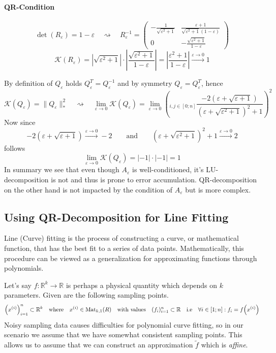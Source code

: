 \paragraph{QR-Condition}
\[\det(R_\varepsilon) = 1 - \varepsilon \quad\rightsquigarrow\quad R_\varepsilon^{-1} =
   \begin{pmatrix}
      -\frac{1}{\sqrt{\varepsilon^2 + 1}} & \frac{\varepsilon + 1}{\sqrt{\varepsilon^2 + 1}(1 - \varepsilon)}\\
      0 & -\frac{\sqrt{\varepsilon^2 + 1}}{1 - \varepsilon}
   \end{pmatrix}
\]
\[\mathcal{K}(R_\varepsilon) = |\sqrt{\varepsilon^2 + 1}| \cdot \left|\frac{\sqrt{\varepsilon^2 + 1}}{1 - \varepsilon}\right| = \left|\frac{\varepsilon^2 + 1}{1 - \varepsilon}\right| \xrightarrow{\varepsilon \to 0} 1\]

By definition of \(Q_\varepsilon\) holds \(Q_\varepsilon^T = Q_\varepsilon^{-1}\) and by symmetry \(Q_\varepsilon = Q_\varepsilon^T\), hence
\[\mathcal{K}(Q_\varepsilon) = \|Q_\varepsilon\|_\ast^2 \quad\rightsquigarrow\quad \lim_{\varepsilon \to 0} \mathcal{K}(Q_\varepsilon) = \lim_{\varepsilon \to 0}\left(_{i,j \in [0;n]} \frac{-2(\varepsilon + \sqrt{\varepsilon + 1})}{(\varepsilon + \sqrt{\varepsilon^2 + 1})^2 + 1}\right)^2\]
Now since
\[-2(\varepsilon + \sqrt{\varepsilon + 1}) \xrightarrow{\varepsilon \to 0} -2 \qquad\text{and}\qquad (\varepsilon + \sqrt{\varepsilon^2 + 1})^2 + 1 \xrightarrow{\varepsilon \to 0} 2\]
follows
\[\lim_{\varepsilon \to 0} \mathcal{K}(Q_\varepsilon) = |-1| \cdot |-1| = 1\]
In summary we see that even though \(A_\varepsilon\) is well-conditioned, it's LU-decomposition is not and thus is prone to error accumulation.
QR-decomposition on the other hand is not impacted by the condition of \(A_\varepsilon\) but is more complex.

\subsection{Using QR-Decomposition for Line Fitting}
Line (Curve) fitting is the process of constructing a curve, or mathematical function, that has the best fit to a series of data points.
Mathematically, this procedure can be viewed as a generalization for approximating functions through polynomials.

Let's say \(f: \mathbb{R}^k \to \mathbb{R}\) is perhaps a physical quantity which depends on \(k\) parameters.
Given are the following sampling points.
\[\Big(x^{(i)}\Big)_{i=1}^n \subset \mathbb{R}^k \quad\text{where}\quad x^{(i)} \in \operatorname{Mat}_{k,1}(R) \quad\text{with values}\quad (f_i)_{i=1}^n \subset \mathbb{R} \quad\text{i.e}\quad \forall i \in [1; n]: f_i = f\Big(x^{(i)}\Big)\]
Noisy sampling data causes difficulties for polynomial curve fitting, so in our scenario we assume that we have somewhat consistent sampling points.
This allows us to assume that we can construct an approximation \(\widetilde{f}\) which is \emph{affine}.


